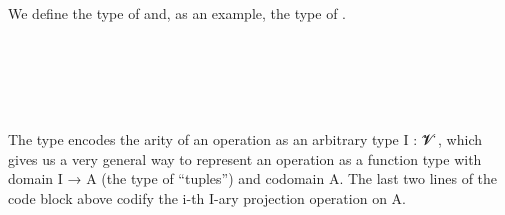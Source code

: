 \documentclass[a4paper,UKenglish,cleveref,autoref,thm-restate]{lipics-v2021}
\begin{document}
We define the type of  and, as an example, the type of .
\ccpad
\begin{code}%
\>[0]\AgdaSpace{}%
\AgdaSymbol{:}\AgdaSpace{}%
\AgdaSpace{}%
\AgdaSpace{}%
\AgdaSpace{}%
\AgdaSpace{}%
\AgdaSpace{}%
\AgdaSpace{}%
\AgdaSpace{}%
\AgdaSpace{}%
\AgdaSpace{}%
\<%
\\
%
\>[0]\AgdaSpace{}%
\AgdaSpace{}%
\AgdaSpace{}%
\AgdaSymbol{=}\AgdaSpace{}%
\AgdaSymbol{(}\AgdaSpace{}%
\AgdaSpace{}%
\AgdaSymbol{)}\AgdaSpace{}%
\AgdaSpace{}%
\<%
\\
\\
\>[1]\AgdaSpace{}%
\AgdaSymbol{:}\AgdaSpace{}%
\AgdaSymbol{\{}\AgdaSpace{}%
\AgdaSymbol{:}\AgdaSpace{}%
\AgdaSpace{}%
\AgdaSpace{}%
\AgdaSymbol{\}}\AgdaSpace{}%
\AgdaSymbol{\{}\AgdaSpace{}%
\AgdaSymbol{:}\AgdaSpace{}%
\AgdaSpace{}%
\AgdaSpace{}%
\AgdaSymbol{\}}\AgdaSpace{}%
\AgdaSpace{}%
\AgdaSpace{}%
\AgdaSpace{}%
\AgdaSpace{}%
\AgdaSpace{}%
\<%
\\
%
\>[1]\AgdaSpace{}%
\AgdaSpace{}%
\AgdaSpace{}%
\AgdaSymbol{=}\AgdaSpace{}%
\AgdaSpace{}%
\<%
\end{code}
\ccpad
The type  encodes the arity of an operation as an arbitrary type \ab I : \ab 𝓥 ̇, which gives us a very general way to represent an operation as a function type with domain \ab I → \ab A (the type of ``tuples'') and codomain \ab A. The last two lines of the code block above codify the \ab i-th \ab I-ary projection operation on \ab A.
\end{document}
